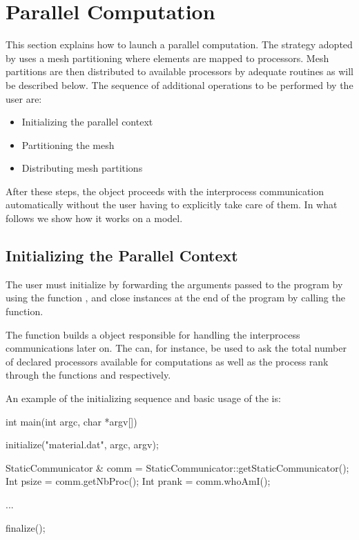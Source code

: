 \chapter{Parallel Computation}

This section explains how to launch a parallel computation.
The strategy adopted by \akantu uses a mesh partitioning
where elements are mapped to processors. Mesh partitions are
then distributed to available processors by adequate routines
as will be described below.
The sequence of additional operations to be performed by the user are:

\begin{itemize}
\item Initializing the parallel context
\item Partitioning the mesh
\item Distributing mesh partitions
\end{itemize}

After these steps, the 
object proceeds with the interprocess communication automatically
without the user having to explicitly take care of them.
In what follows we show how it works on a  model.

\section{Initializing the Parallel Context}

The user must initialize \akantu by forwarding the arguments passed to the
program by using the function , and close \akantu instances
at the end of the program by calling the  function.


The  function builds a  object
responsible for handling the interprocess communications later on.  The
 can, for instance, be used to ask the total number of
declared processors available for computations as well as the process rank
through the functions  and  respectively.

An example of the initializing sequence and basic usage of the
 is:

\begin{cpp}
int main(int argc, char *argv[])
{
  initialize("material.dat", argc, argv);

  StaticCommunicator & comm = StaticCommunicator::getStaticCommunicator();
  Int psize = comm.getNbProc();
  Int prank = comm.whoAmI();

  ...

  finalize();
}
\end{cpp}

